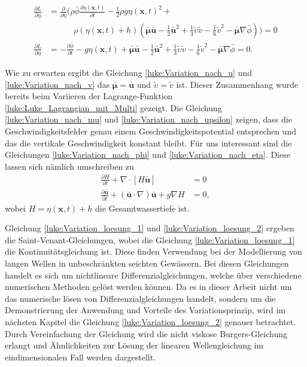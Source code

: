 \begin{align}
	\\
	\frac{\partial L}{\partial \eta}
	&=
	\frac{\partial \mathscr{}}{\partial \eta}
	\Bigg(\rho\bar{\phi}\frac{\partial \eta(\bm{x}, t)}{\partial t}
	-
	\frac{1}{2} \rho g \eta(\bm{x}, t)^2
	+
	\nonumber \\
	&\qquad\quad
	\rho(\eta(\bm{x}, t) + h)
	\left(
	\bar{\bm{\mu}}\bar{\bm{u}}
	-
	\frac{1}{2} \bar{\bm{u}}^2 
	+
	\frac{1}{3} \tilde{\upsilon}\tilde{v}
	-
	\frac{1}{6}\tilde{v}^2
	-
	\bar{\bm{\mu}}\nabla \bar{\phi}
	\right)
	\Bigg)
	= 0
	\nonumber \\
	\frac{\partial L}{\partial \eta}
	&=
	-
	\frac{\partial \bar{\phi}}{\partial t}
	-
	g\eta(\bm{x}, t)
	+
	\bar{\bm{\mu}}\bar{\bm{u}}
	-
	\frac{1}{2} \bar{\bm{u}}^2 
	+
	\frac{1}{3} \tilde{\upsilon}\tilde{v}
	-
	\frac{1}{6}\tilde{v}^2
	-
	\bar{\bm{\mu}}\nabla \bar{\phi}
	= 0.
	\label{luke:Variation_nach_eta}
\end{align}

Wie zu erwarten ergibt die Gleichung \eqref{luke:Variation_nach_u} und \eqref{luke:Variation_nach_v} das $\bar{\bm{\mu}} = \bar{\bm{u}}$ und $\tilde{\upsilon} = \tilde{v}$ ist.
Dieser Zusammenhang wurde bereits beim Variieren der Lagrange-Funktion \eqref{luke:Luke_Lagrangian_mit_Multi} gezeigt.
Die Gleichung \eqref{luke:Variation_nach_mu} und \eqref{luke:Variation_nach_upsilon} zeigen, dass die Geschwindigkeitsfelder genau einem Geschwindigkeitspotential entsprechen und das die vertikale Geschwindigkeit konstant bleibt. 
Für uns interessant sind die Gleichungen \eqref{luke:Variation_nach_phi} und \eqref{luke:Variation_nach_eta}.
Diese lassen sich nämlich umschreiben zu 
\begin{align}
	\frac{\partial H}{\partial t} + \nabla \cdot [H \bar{\bm{u}}] &= 0
	\label{luke:Variation_loesung_1}
\\
	\frac{\partial \bar{\bm{u}}}{\partial t} + (\bar{\bm{u}} \cdot \nabla) \bar{\bm{u}} + g \nabla H &= 0,
	\label{luke:Variation_loesung_2}
\end{align}
wobei $H = \eta(\bm{x},t) + h$ die Gesamtwassertiefe ist.

Gleichung \eqref{luke:Variation_loesung_1} und \eqref{luke:Variation_loesung_2} ergeben die Saint-Venant-Gleichungen, wobei die Gleichung \eqref{luke:Variation_loesung_1} die Kontinuitätsgleichung ist.
Diese finden Verwendung bei der Modellierung von langen Wellen in unbeschränkten seichten Gewässern.
Bei diesen Gleichungen handelt es sich um nichtlineare Differenzialgleichungen, welche über verschiedene numerischen Methoden gelöst werden können.
Da es in dieser Arbeit nicht um das numerische lösen von Differenzialgleichungen handelt, sondern um die Demonstrierung der Anwendung und Vorteile des Variationsprinzip, wird im nächsten Kapitel die Gleichung \eqref{luke:Variation_loesung_2} genauer betrachtet.
Durch Vereinfachung der Gleichung wird die nicht viskose Burgers-Gleichung erlangt und Ähnlichkeiten zur Lösung der linearen Wellengleichung im eindimensionalen Fall werden dargestellt.

